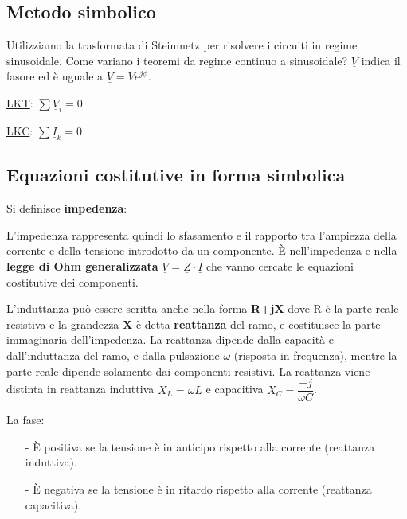 \documentclass{article}
\begin{document}
\subsection{Metodo simbolico}
\noindent Utilizziamo la trasformata di Steinmetz per risolvere i circuiti in regime sinusoidale. Come variano i teoremi da 
regime continuo a sinusoidale? $\underline{V}$ indica il fasore ed è uguale a $\underline{V}=Ve^{j\phi}$.

\noindent \underline{LKT}: $\sum \underline{V}_i=0$ 

\noindent \underline{LKC}: $\sum \underline{I}_k=0$ 

\subsection{Equazioni costitutive in forma simbolica}
\noindent Si definisce \textbf{impedenza}:

\medskip
\noindent{}
\medskip

\noindent L'impedenza rappresenta quindi lo sfasamento e il rapporto tra l'ampiezza della corrente e della tensione introdotto da un
 componente. È nell'impedenza e nella \textbf{legge di Ohm generalizzata} $\underline{V}=\underline{Z}\cdot\underline{I}$
che vanno cercate le equazioni costitutive dei componenti.
\medskip 

\noindent L'induttanza può essere scritta anche nella forma \textbf{R+jX} dove R è la parte reale resistiva e 
la grandezza \textbf{X} è detta \textbf{reattanza} del ramo, e costituisce la parte immaginaria dell'impedenza. La
reattanza dipende dalla capacità e dall'induttanza del ramo, e dalla pulsazione $\omega$ (risposta in frequenza),
 mentre la parte reale dipende solamente dai componenti resistivi.
La reattanza viene distinta in reattanza induttiva $X_L=\omega L$ e capacitiva $X_C=\dfrac{-j}{\omega C}$.


\noindent La fase:\begin{itemize}
    \item[-] È positiva se la tensione è in anticipo rispetto alla corrente (reattanza induttiva).
    \item[-] È negativa se la tensione è in ritardo rispetto alla corrente (reattanza capacitiva).
\end{itemize}
\medskip
\end{document}
